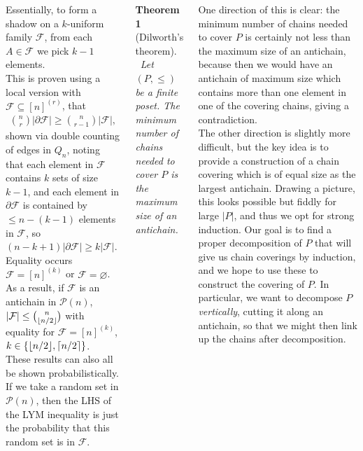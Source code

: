 \documentclass{tikzposter} %
\newcommand{\mc}{\mathcal}
\DeclarePairedDelimiter{\floor}{\lfloor}{\rfloor}
\DeclarePairedDelimiter{\ceil}{\lceil}{\rceil}
\newtheorem{theorem}{Theorem}
\begin{document}
\begin{columns}
{    Essentially, to form a shadow on a $k$-uniform family $\mc{F}$, from each $A \in \mc{F}$ we pick $k-1$ elements. \\

    This is proven using a local version with $\mathcal{F} \subseteq [n]^{(r)}$, that
    \begin{align*}
      {n \choose r} |\partial \mc{F}| \ge {n \choose r-1} |\mc{F}|,
    \end{align*}
    shown via double counting of edges in $Q_n$, noting that each element in $\mathcal{F}$ contains $k$ sets of size $k-1$, and each element in $\partial \mathcal{F}$ is contained by $\le n - (k-1)$ elements in $\mathcal{F}$, so $(n - k + 1) |\partial \mc{F}| \ge k |\mc{F}|$. Equality occurs $\mc{F} = [n]^{(k)}$ or $\mc{F} = \varnothing$. \\

    As a result, if $\mc{F}$ is an antichain in $\mc{P}(n)$, $|\mc{F}| \le {n \choose \floor{n/2}}$ with equality for $\mc{F} = [n]^{(k)}$, $k \in \{\floor{n/2}, \ceil{n/2}\}$. \\

    These results can also all be shown probabilistically. If we take a random set in $\mc{P}(n)$, then the LHS of the LYM inequality is just the probability that this random set is in $\mc{F}$. \\

    \begin{theorem}[Dilworth's theorem]
    \ Let $(P, \le)$ be a finite poset. The minimum number of chains needed to cover $P$ is the maximum size of an antichain.
    \end{theorem}
    \hphantom{}

    One direction of this is clear: the minimum number of chains needed to cover $P$ is certainly not less than the maximum size of an antichain, because then we would have an antichain of maximum size which contains more than one element in one of the covering chains, giving a contradiction. \\

    The other direction is slightly more difficult, but the key idea is to provide a construction of a chain covering which is of equal size as the largest antichain. Drawing a picture, this looks possible but fiddly for large $|P|$, and thus we opt for strong induction. Our goal is to find a proper decomposition of $P$ that will give us chain coverings by induction, and we hope to use these to construct the covering of $P$. In particular, we want to decompose $P$ \emph{vertically}, cutting it along an antichain, so that we might then link up the chains after decomposition. \\

}
\end{columns}
\end{document}
